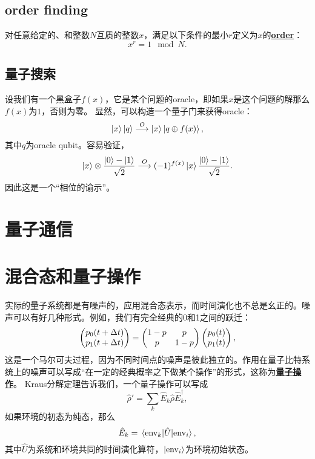 \documentclass[hyperref, UTF8, a4paper]{ctexart}
\newcommand*{\concept}[1]{\underline{\textbf{#1}}}
\begin{document}
\subsection{order finding}

对任意给定的、和整数$N$互质的整数$x$，满足以下条件的最小$r$定义为$x$的\concept{order}：
\begin{equation}
    x^r = 1 \mod{N}.
\end{equation}

\subsection{量子搜索}

设我们有一个黑盒子$f(x)$，它是某个问题的oracle，即如果$x$是这个问题的解那么$f(x)$为$1$，否则为零。
显然，可以构造一个量子门来获得oracle：
\begin{equation}
    \ket{x} \ket{q} \stackrel{O}{\longrightarrow} \ket{x} \ket{q \oplus f(x)},
\end{equation}
其中$q$为oracle qubit。容易验证，
\begin{equation}
    \ket{x} \otimes \frac{\ket{0} - \ket{1}}{\sqrt{2}} \stackrel{O}{\longrightarrow} (-1)^{f(x)} \ket{x} \frac{\ket{0} - \ket{1}}{\sqrt{2}}.
\end{equation}
因此这是一个“相位的谕示”。

\section{量子通信}



\section{混合态和量子操作}

实际的量子系统都是有噪声的，应用混合态表示，而时间演化也不总是幺正的。噪声可以有好几种形式。例如，我们有完全经典的0和1之间的跃迁：
\begin{equation}
    \pmqty{p_0(t+\Delta t) \\ p_1(t+\Delta t)} = \pmqty{ 1 - p & p \\ p & 1-p } \pmqty{p_0(t) \\ p_1(t)},
\end{equation}
这是一个马尔可夫过程，因为不同时间点的噪声是彼此独立的。作用在量子比特系统上的噪声可以写成“在一定的经典概率之下做某个操作”的形式，这称为\concept{量子操作}。
Kraus分解定理告诉我们，一个量子操作可以写成
\[
    \hat{\rho}' = \sum_k \hat{E}_k \hat{\rho} \hat{E}_k^\dagger,
\]
如果环境的初态为纯态，那么
\[
    \hat{E}_k = \mel*{\text{env}_k}{\hat{U}}{\text{env}_i},
\]
其中$\hat{U}$为系统和环境共同的时间演化算符，$\ket{\text{env}_i}$为环境初始状态。
\end{document}
